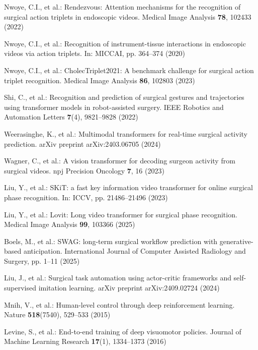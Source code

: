 \documentclass[runningheads]{llncs}
\begin{document}
\begin{thebibliography}{22}
Nwoye, C.I., et al.: Rendezvous: Attention mechanisms for the recognition of surgical action triplets in endoscopic videos. Medical Image Analysis \textbf{78}, 102433 (2022)

Nwoye, C.I., et al.: Recognition of instrument-tissue interactions in endoscopic videos via action triplets. In: MICCAI, pp. 364--374 (2020)

Nwoye, C.I., et al.: CholecTriplet2021: A benchmark challenge for surgical action triplet recognition. Medical Image Analysis \textbf{86}, 102803 (2023)

Shi, C., et al.: Recognition and prediction of surgical gestures and trajectories using transformer models in robot-assisted surgery. IEEE Robotics and Automation Letters \textbf{7}(4), 9821--9828 (2022)

Weerasinghe, K., et al.: Multimodal transformers for real-time surgical activity prediction. arXiv preprint arXiv:2403.06705 (2024)

Wagner, C., et al.: A vision transformer for decoding surgeon activity from surgical videos. npj Precision Oncology \textbf{7}, 16 (2023)

Liu, Y., et al.: SKiT: a fast key information video transformer for online surgical phase recognition. In: ICCV, pp. 21486--21496 (2023)

Liu, Y., et al.: Lovit: Long video transformer for surgical phase recognition. Medical Image Analysis \textbf{99}, 103366 (2025)

Boels, M., et al.: SWAG: long-term surgical workflow prediction with generative-based anticipation. International Journal of Computer Assisted Radiology and Surgery, pp. 1--11 (2025)

Liu, J., et al.: Surgical task automation using actor-critic frameworks and self-supervised imitation learning. arXiv preprint arXiv:2409.02724 (2024)

Mnih, V., et al.: Human-level control through deep reinforcement learning. Nature \textbf{518}(7540), 529--533 (2015)

Levine, S., et al.: End-to-end training of deep visuomotor policies. Journal of Machine Learning Research \textbf{17}(1), 1334--1373 (2016)


\end{thebibliography}
\end{document}
